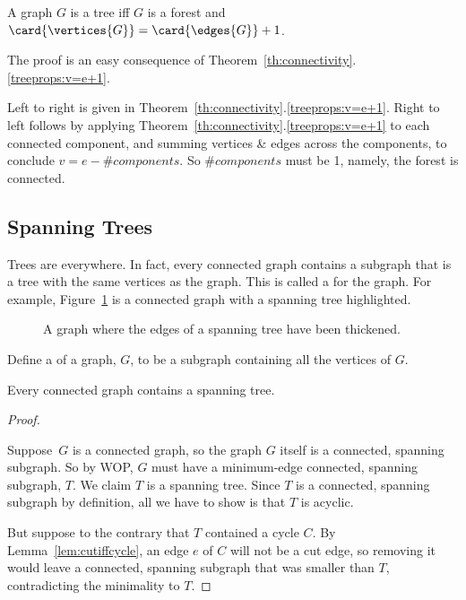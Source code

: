 \begin{lemma}\label{lem:iffe=v-1}
A graph $G$ is a tree iff $G$ is a forest and $\card{\vertices{G}} =
\card{\edges{G}} +1$.
\end{lemma}

The proof is an easy consequence of
Theorem~\ref{th:connectivity}.\ref{treeprops:v=e+1}.

\begin{editingnotes}
Left to right is given in
Theorem~\ref{th:connectivity}.\ref{treeprops:v=e+1}.  Right to left
follows by applying
Theorem~\ref{th:connectivity}.\ref{treeprops:v=e+1} to each connected
component, and summing vertices \& edges across the components, to
conclude $v=e-\#components$.  So $\#components$ must be 1, namely, the
forest is connected.  
\end{editingnotes}

\subsection{Spanning Trees}\label{spantree_subsec}

Trees are everywhere.  In fact, every connected graph contains a
subgraph that is a tree with the same vertices as the graph.  This is
called a  for the graph.  For example,
Figure~\ref{fig:5LL} is a connected graph with a spanning tree
highlighted.

\begin{figure}


\caption{A graph where the edges of a spanning tree have been
  thickened.}

\label{fig:5LL}

\end{figure}

\begin{definition}
Define a  of a graph, $G$, to be a subgraph
containing all the vertices of $G$.
\end{definition}

\begin{theorem}
Every connected graph contains a spanning tree.
\end{theorem}

\begin{proof}
\begin{editingnotes}
\end{editingnotes}
Suppose~$G$ is a connected graph, so the graph $G$ itself is a
connected, spanning subgraph.  So by WOP, $G$ must have a minimum-edge
connected, spanning subgraph, $T$.  We claim $T$ is a spanning tree.
Since $T$ is a connected, spanning subgraph by definition, all we have
to show is that $T$ is acyclic.

But suppose to the contrary that $T$ contained a cycle $C$.  By
Lemma~\ref{lem:cutiffcycle}, an edge $e$ of $C$ will not be a cut
edge, so removing it would leave a connected, spanning subgraph that
was smaller than $T$, contradicting the minimality to $T$.
\end{proof}

